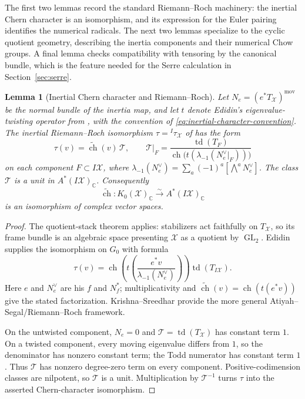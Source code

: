 \documentclass[11pt]{article}
\theoremstyle{plain}
\newtheorem{lemma}[theorem]{Lemma}
\theoremstyle{definition}
\theoremstyle{remark}
\newcommand{\cX}{\mathcal X}
\newcommand{\C}{\mathbb C}
\newcommand{\1}{\mathbf 1}
\begin{document}
The first two lemmas record the standard Riemann--Roch machinery: the inertial Chern character is an isomorphism, and its expression for the Euler pairing identifies the numerical radicals.  The next two lemmas specialize to the cyclic quotient geometry, describing the inertia components and their numerical Chow groups.  A final lemma checks compatibility with tensoring by the canonical bundle, which is the feature needed for the Serre calculation in Section~\ref{sec:serre}.

\begin{lemma}[Inertial Chern character and Riemann--Roch]\label{lem:app-inertial-ch}
Let $N_e=(e^*T_{\cX})^{\mathrm{mov}}$ be the normal bundle of the inertia map, and let $t$ denote Edidin's eigenvalue-twisting operator from \cite[Section 4.3.2]{Edidin}, with the convention of \eqref{eq:inertial-character-convention}.  The inertial Riemann--Roch isomorphism $\tau={}^I\tau_{\cX}$ of \cite[Theorem 5.1]{Edidin} has the form
\[
\tau(v)=\widetilde{\operatorname{ch}}(v)\,\mathcal T,
\qquad
\mathcal T|_F=
\frac{\operatorname{td}(T_F)}
{\operatorname{ch}\bigl(t(\lambda_{-1}(N_e^\vee|_F))\bigr)}
\]
on each component $F\subset I\cX$, where $\lambda_{-1}(N_e^\vee)=\sum_a(-1)^a[\bigwedge^aN_e^\vee]$.  The class $\mathcal T$ is a unit in $A^*(I\cX)_{\C}$.  Consequently
\[
\widetilde{\operatorname{ch}}:K_0(\cX)_{\C}\xrightarrow{\sim}A^*(I\cX)_{\C}
\]
is an isomorphism of complex vector spaces.
\end{lemma}

\begin{proof}
The quotient-stack theorem applies: stabilizers act faithfully on $T_{\cX}$, so its frame bundle is an algebraic space presenting $\cX$ as a quotient by $\operatorname{GL}_2$.  Edidin \cite[Theorem 5.1]{Edidin} supplies the isomorphism on $G_0$ with formula
\[
\tau(v)=\operatorname{ch}\!\left(t\!\left(
\frac{e^*v}{\lambda_{-1}(N_e^\vee)}\right)\right)
\operatorname{td}(T_{I\cX}).
\]
Here $e$ and $N_e^\vee$ are his $f$ and $N_f^*$; multiplicativity and $\widetilde{\operatorname{ch}}(v)=\operatorname{ch}(t(e^*v))$ give the stated factorization.  Krishna--Sreedhar \cite[Theorem 1.2]{KrishnaSreedhar} provide the more general Atiyah--Segal/Riemann--Roch framework.

On the untwisted component, $N_e=0$ and $\mathcal T=\operatorname{td}(T_{\cX})$ has constant term $1$.  On a twisted component, every moving eigenvalue differs from $1$, so the denominator has nonzero constant term; the Todd numerator has constant term $1$.  Thus $\mathcal T$ has nonzero degree-zero term on every component.  Positive-codimension classes are nilpotent, so $\mathcal T$ is a unit.  Multiplication by $\mathcal T^{-1}$ turns $\tau$ into the asserted Chern-character isomorphism.
\end{proof}
\end{document}
